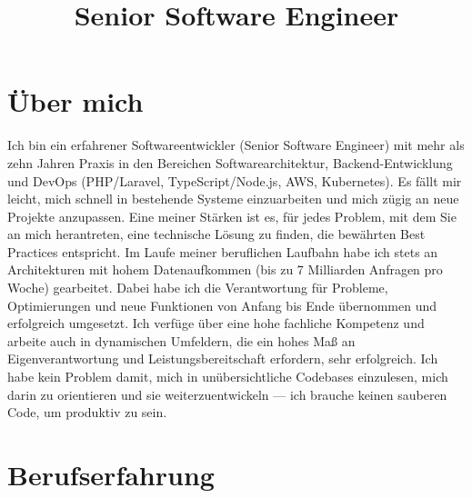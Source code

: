 \documentclass[11pt,a4paper,sans]{moderncv}
\title{Senior Software Engineer}
\begin{document}
\makecvtitle

\vspace{-2em}

\section{\"Uber mich}
Ich bin ein erfahrener Softwareentwickler (Senior Software Engineer) mit mehr als zehn Jahren Praxis in den Bereichen Softwarearchitektur, Backend-Entwicklung und DevOps (PHP/Laravel, TypeScript/Node.js, AWS, Kubernetes). Es f\"allt mir leicht, mich schnell in bestehende Systeme einzuarbeiten und mich z\"ugig an neue Projekte anzupassen. Eine meiner St\"arken ist es, f\"ur jedes Problem, mit dem Sie an mich herantreten, eine technische L\"osung zu finden, die bew\"ahrten Best Practices entspricht. Im Laufe meiner beruflichen Laufbahn habe ich stets an Architekturen mit hohem Datenaufkommen (bis zu 7 Milliarden Anfragen pro Woche) gearbeitet. Dabei habe ich die Verantwortung f\"ur Probleme, Optimierungen und neue Funktionen von Anfang bis Ende \"ubernommen und erfolgreich umgesetzt. Ich verf\"uge \"uber eine hohe fachliche Kompetenz und arbeite auch in dynamischen Umfeldern, die ein hohes Ma\ss{} an Eigenverantwortung und Leistungsbereitschaft erfordern, sehr erfolgreich. Ich habe kein Problem damit, mich in un\"ubersichtliche Codebases einzulesen, mich darin zu orientieren und sie weiterzuentwickeln --- ich brauche keinen sauberen Code, um produktiv zu sein.

\section{Berufserfahrung}
\end{document}
